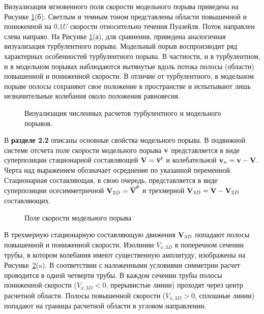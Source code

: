 Визуализация мгновенного поля скорости модельного порыва приведена на Рисунке \ref{3D_img}(б). Светлым и темным тоном представлены области повышенной и пониженной на $0.1U$ скорости относительно течения Пуазейля. Поток направлен слева направо. На Рисунке \ref{3D_img}(а), для сравнения, приведена аналогичная визуализация турбулентного порыва. Модельный порыв воспроизводит ряд характерных особенностей турбулентного порыва. В частности, и в турбулентном, и в модельном порывах наблюдаются вытянутые вдоль потока полосы (области) повышенной и пониженной скорости. В отличие от турбулентного, в модельном порыве полосы сохраняют свое положение в пространстве и испытывают лишь незначительные колебания около положения равновесия. 

\begin{figure}
\caption{Визуализация численных расчетов турбулентного и модельного порывов.}
\label{3D_img}
\end{figure}


В \textbf{разделе 2.2} описаны основные свойства модельного порыва. В подвижной системе отсчета поле скорости модельного порыва $\mathbf{v}$ представляется в виде суперпозиции стационарной составляющей $\mathbf{V} = \overline{\mathbf{v}}^t$ и колебательной $\mathbf{v}_n = \mathbf{v} - \mathbf{V}$. Черта над выражением обозначает осреднение по указанной переменной. Стационарная составляющая, в свою очередь, представляется в виде суперпозиции осесимметричной $\mathbf{V}_{2D} = \overline{\mathbf{V}}^{\theta}$ и трехмерной $\mathbf{V}_{3D} = \mathbf{V} - \mathbf{V}_{2D}$ составляющих. 

\begin{figure}
\caption{Поле скорости модельного порыва}
\label{mp_cs_pic}
\end{figure}

В трехмерную стационарную составляющую движения $\mathbf{V}_{3D}$ попадают полосы повышенной и пониженной скорости. Изолинии $V_{x, 3D}$ в поперечном сечении трубы, в котором колебания имеют существенную амплитуду, изображены на Рисунке~\ref{mp_cs_pic}(a). В соответствии с наложенными условиями симметрии расчет проводится в одной четверти трубы. В каждом сечении трубы полосы пониженной скорости ($V_{x,3D} < 0$, прерывистые линии) проходят через центр расчетной области. Полосы повышенной скорости ($V_{x,3D} > 0$, сплошные линии) попадают на границы расчетной области в угловом направлении. 

